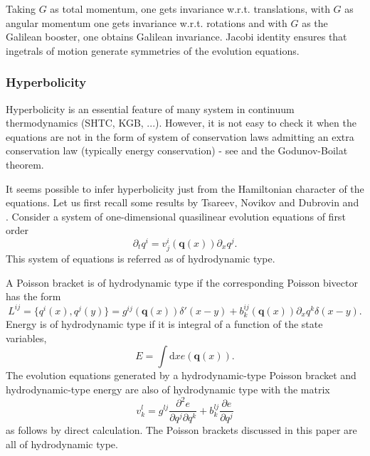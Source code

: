 \documentclass[
10pt, %
a4paper, %
oneside, %
headinclude,footinclude, %
BCOR5mm, %
]{scrartcl}
\newcommand{\diff}{\mathrm{d}}
\newcommand{\qq}{\mathbf{q}}
\begin{document}
Taking $G$ as total momentum, one gets invariance w.r.t. translations, with $G$ as angular momentum one gets invariance w.r.t. rotations and with $G$ as the Galilean booster, one obtains Galilean invariance. Jacobi identity ensures that ingetrals of motion generate symmetries of the evolution equations.

\subsubsection{Hyperbolicity}
Hyperbolicity is an essential feature of many system in continuum thermodynamics (SHTC, KGB, ...). However, it is not easy to check it when the equations are not in the form of system of conservation laws admitting an extra conservation law (typically energy conservation) - see \cite{SHTC-GENERIC} and the Godunov-Boilat theorem.

It seems possible to infer hyperbolicity just from the Hamiltonian character of the equations. Let us first recall some results by Tsareev, Novikov and Dubrovin \cite{Tsarev} and \cite{Novikov}. 
Consider a system of one-dimensional quasilinear evolution equations of first order 
\begin{equation}\label{eqn.hydro.type}
	\partial_t q^i = v^i_j(\qq(x)) \partial_x q^j.
\end{equation}
This system of equations is referred as of hydrodynamic type. 

A Poisson bracket is of hydrodynamic type if the corresponding Poisson bivector has the form
\begin{equation}
	L^{ij} = \{q^i(x),q^j(y)\} = g^{ij}(\qq(x)) \delta'(x-y) + b^{ij}_k (\qq(x)) \partial_x q^k \delta(x-y).
\end{equation}
Energy is of hydrodynamic type if it is integral of a function of the state variables, 
\begin{equation}
	E = \int \diff x e(\qq(x)).
\end{equation}
The evolution equations generated by a hydrodynamic-type Poisson bracket and hydrodynamic-type energy are also of hydrodynamic type with the matrix
\begin{equation}
	v^l_k = g^{lj} \frac{\partial^2 e}{\partial q^j \partial q^k} + b^{lj}_k \frac{\partial e}{\partial q^j}
\end{equation}
as follows by direct calculation.
The Poisson brackets discussed in this paper are all of hydrodynamic type.
\end{document}
